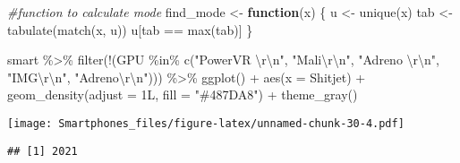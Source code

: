 \documentclass[
]{article}
\newenvironment{Shaded}{\begin{snugshade}}{\end{snugshade}}
\newcommand{\AttributeTok}[1]{\textcolor[rgb]{0.77,0.63,0.00}{#1}}
\newcommand{\CommentTok}[1]{\textcolor[rgb]{0.56,0.35,0.01}{\textit{#1}}}
\newcommand{\ControlFlowTok}[1]{\textcolor[rgb]{0.13,0.29,0.53}{\textbf{#1}}}
\newcommand{\FunctionTok}[1]{\textcolor[rgb]{0.00,0.00,0.00}{#1}}
\newcommand{\NormalTok}[1]{#1}
\newcommand{\OtherTok}[1]{\textcolor[rgb]{0.56,0.35,0.01}{#1}}
\newcommand{\SpecialCharTok}[1]{\textcolor[rgb]{0.00,0.00,0.00}{#1}}
\newcommand{\StringTok}[1]{\textcolor[rgb]{0.31,0.60,0.02}{#1}}
\begin{document}
\begin{Shaded}
\begin{Highlighting}[]
\CommentTok{\#function to calculate mode}
\NormalTok{find\_mode }\OtherTok{\textless{}{-}} \ControlFlowTok{function}\NormalTok{(x) \{}
\NormalTok{  u }\OtherTok{\textless{}{-}} \FunctionTok{unique}\NormalTok{(x)}
\NormalTok{  tab }\OtherTok{\textless{}{-}} \FunctionTok{tabulate}\NormalTok{(}\FunctionTok{match}\NormalTok{(x, u))}
\NormalTok{  u[tab }\SpecialCharTok{==} \FunctionTok{max}\NormalTok{(tab)]}
\NormalTok{\}}

\NormalTok{smart }\SpecialCharTok{\%\textgreater{}\%}
 \FunctionTok{filter}\NormalTok{(}\SpecialCharTok{!}\NormalTok{(GPU }\SpecialCharTok{\%in\%} \FunctionTok{c}\NormalTok{(}\StringTok{"PowerVR }\SpecialCharTok{\textbackslash{}r\textbackslash{}n}\StringTok{"}\NormalTok{, }\StringTok{"Mali}\SpecialCharTok{\textbackslash{}r\textbackslash{}n}\StringTok{"}\NormalTok{, }\StringTok{"Adreno }\SpecialCharTok{\textbackslash{}r\textbackslash{}n}\StringTok{"}\NormalTok{, }\StringTok{"IMG}\SpecialCharTok{\textbackslash{}r\textbackslash{}n}\StringTok{"}\NormalTok{, }\StringTok{"Adreno}\SpecialCharTok{\textbackslash{}r\textbackslash{}n}\StringTok{"}\NormalTok{))) }\SpecialCharTok{\%\textgreater{}\%}
 \FunctionTok{ggplot}\NormalTok{() }\SpecialCharTok{+}
  \FunctionTok{aes}\NormalTok{(}\AttributeTok{x =}\NormalTok{ Shitjet) }\SpecialCharTok{+}
  \FunctionTok{geom\_density}\NormalTok{(}\AttributeTok{adjust =}\NormalTok{ 1L, }\AttributeTok{fill =} \StringTok{"\#487DA8"}\NormalTok{) }\SpecialCharTok{+}
  \FunctionTok{theme\_gray}\NormalTok{()}
\end{Highlighting}
\end{Shaded}

\texttt{[image: Smartphones\_files/figure-latex/unnamed-chunk-30-4.pdf]}

\begin{Shaded}
\end{Shaded}

\begin{verbatim}
## [1] 2021
\end{verbatim}
\end{document}
